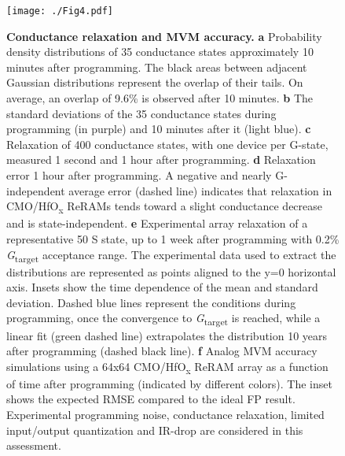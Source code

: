 \begin{figure}[H]
\centering
\texttt{[image: ./Fig4.pdf]}
\caption{\textbf{Conductance relaxation and MVM accuracy.} \textbf{a} Probability density distributions of 35 conductance states approximately 10 minutes after programming. The black areas between adjacent Gaussian distributions represent the overlap of their tails. On average, an overlap of 9.6\% is observed after 10 minutes. \textbf{b} The standard deviations of the 35 conductance states during programming (in purple) and 10 minutes after it (light blue). \textbf{c} Relaxation of 400 conductance states, with one device per G-state, measured 1 second and 1 hour after programming. \textbf{d} Relaxation error 1 hour after programming. A negative and nearly G-independent average error (dashed line) indicates that relaxation in CMO/HfO\textsubscript{\textnormal{x}} ReRAMs tends toward a slight conductance decrease and is state-independent. \textbf{e} Experimental array relaxation of a representative 50 \textmu S state, up to 1 week after programming with 0.2\% \textit{G}\textsubscript{\textnormal{target}} acceptance range. The experimental data used to extract the distributions are represented as points aligned to the y=0 horizontal axis. Insets show the time dependence of the mean and standard deviation. Dashed blue lines represent the conditions during programming, once the convergence to \textit{G}\textsubscript{\textnormal{target}} is reached, while a linear fit (green dashed line) extrapolates the distribution 10 years after programming (dashed black line).
\textbf{f} Analog MVM accuracy simulations using a 64x64 CMO/HfO\textsubscript{\textnormal{x}} ReRAM array as a function of time after programming (indicated by different colors). The inset shows the expected RMSE compared to the ideal FP result.  Experimental programming noise, conductance relaxation, limited input/output quantization and IR-drop are considered in this assessment.}
\label{fig4}
\end{figure}



